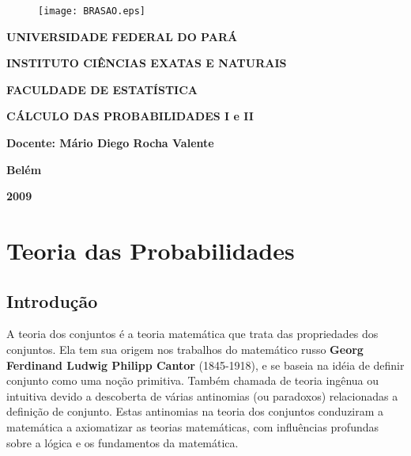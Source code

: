 \documentclass[a4paper,12pt]{report}
\begin{document}
\begin{center}
\begin{figure}
\vspace*{-2cm} \centering
\texttt{[image: BRASAO.eps]}
\end{figure}
\end{center}

\vspace{-1cm}

 {\centerline{\normalsize{\large \bf UNIVERSIDADE FEDERAL DO
PARÁ}}\vspace{0.3cm} \centerline{\normalsize{\large \bf INSTITUTO
CIÊNCIAS EXATAS E NATURAIS }}\vspace{0.3cm}
\centerline{\normalsize{\large \bf FACULDADE DE
ESTATÍSTICA}}\vspace{0.3cm}\centerline{\normalsize{\large }}
\vspace{4cm}

\centerline{\Large{\bf CÁLCULO DAS PROBABILIDADES I e
II}}\vspace{0.5cm} \centerline{\Large{\bf }}\vspace{5cm}


\centerline{\Large {\bf Docente: Mário Diego Rocha Valente {\it }
}}\vspace{0.5cm} \centerline{\Large {\bf  }}\vspace{0.5cm}
\centerline{\Large {\bf }} \vspace{3cm}



\centerline{\normalsize {\large \bf Belém}}
 \centerline{\normalsize {\large \bf
2009}}


\tableofcontents

\chapter{Teoria das Probabilidades}
\section{Introdução}


 A teoria dos conjuntos é a teoria matemática que trata das
propriedades dos conjuntos. Ela tem sua origem nos trabalhos do
matemático russo \textbf{Georg Ferdinand Ludwig Philipp Cantor}
(1845-1918), e se baseia na idéia de definir conjunto como uma
noção primitiva. Também chamada de teoria ingênua ou intuitiva
devido a descoberta de várias antinomias (ou paradoxos)
relacionadas a definição de conjunto. Estas antinomias na teoria
dos conjuntos conduziram a matemática a axiomatizar as teorias
matemáticas, com influências profundas sobre a lógica e os
fundamentos da matemática.



}
\end{document}
